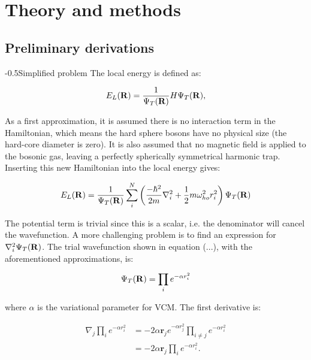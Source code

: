\documentclass[english, a4paper]{article}
\makeatletter
\renewcommand{\subsubsection}{\@startsection{subsubsection}{3}{0pt}%
{-\baselineskip}{0.5\baselineskip}{\bf\large}}
\newcommand{\bm}[1]{\mathbf{#1}}
\makeatother
\begin{document}
\section{Theory and methods}
\subsection{Preliminary derivations}

\subsubsection{Simplified problem}
The local energy is defined as:

\begin{equation}
    E_L({\bf R})=\frac{1}{\Psi_T({\bf R})}H\Psi_T({\bf R}),
    \label{eq:locale}
\end{equation}

As a first approximation, it is assumed there is no interaction term in the Hamiltonian, which means the hard sphere bosons have no physical size (the hard-core diameter is zero). It is also assumed that no magnetic field is applied to the bosonic gas, leaving a perfectly spherically symmetrical harmonic trap. Inserting this new Hamiltonian into the local energy gives:

\begin{equation}
  E_L({\bf R})=\frac{1}{\Psi_T({\bf R})}\sum_i^N \left(
  \frac{-\hbar^2}{2m}
  \nabla_{i}^2 +
  \frac{1}{2}m\omega_{ho}^2r_i^2\right)\Psi_T({\bf R})
  \label{eq:localeInsertH}
\end{equation}

The potential term is trivial since this is a scalar, i.e. the denominator will cancel the wavefunction. A more challenging problem is to find an expression for $\nabla^2_i\Psi_T({\bf R})$. The trial wavefunction shown in equation (...), with the aforementioned approximations, is:

\begin{equation}
 \Psi_T({\bf R}) = \prod_i e^{-\alpha r_i^2}	\label{wavefunction_a}
\end{equation}

where $\alpha$ is the variational parameter for VCM. The first derivative is:

\begin{align}
 \nabla_j\prod_i e^{-\alpha r_i^2} 
 &= -2\alpha \bm{r}_j e^{-\alpha r_j^2} \prod_{i \neq j} e^{-\alpha r_i^2}\\
 &= -2\alpha \bm{r}_j  \prod_i e^{-\alpha r_i^2}.
 \label{E_L_first_derivative}
\end{align}
\end{document}
